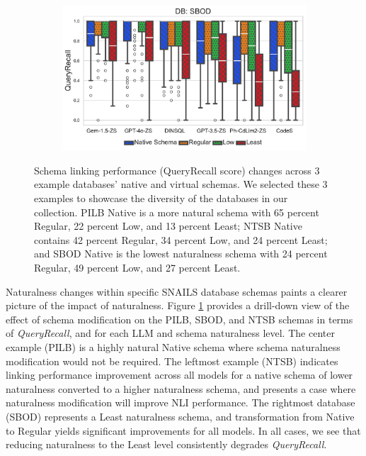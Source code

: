 \begin{figure}
\begin{subfigure}{\figwidthmod\linewidth}
  \end{subfigure}
  \begin{subfigure}{\figwidthmod\linewidth}
    \includegraphics[width=\linewidth]{figures/natlevel-model-recall-boxplot-db-subset-SBOD.pdf}
  \end{subfigure}
  \caption{Schema linking performance (QueryRecall score) changes across 3 example databases' native and virtual schemas. We selected these 3 examples to showcase the diversity of the databases in our collection. PILB Native is a more natural schema with 65 percent Regular, 22 percent Low, and 13 percent Least; NTSB Native contains 42 percent Regular, 34 percent Low, and 24 percent Least; and SBOD Native is the lowest naturalness schema with 24 percent Regular, 49 percent Low, and 27 percent Least.}
  \label{fig:recall-boxplot-dbs}
\end{figure}

Naturalness changes within specific SNAILS database schemas paints a clearer picture of the impact of naturalness.
Figure \ref{fig:recall-boxplot-dbs} provides a drill-down view of the effect of schema modification on the PILB, SBOD, and NTSB schemas in terms of \emph{QueryRecall}, and for each LLM and schema naturalness level.
The center example (PILB) is a highly natural Native schema where schema naturalness modification would not be required. The leftmost example (NTSB) indicates linking performance improvement across all models for a native schema of lower naturalness converted to a higher naturalness schema, and presents a case where naturalness modification will improve NLI performance. The rightmost database (SBOD) represents a Least naturalness schema, and transformation from Native to Regular yields significant improvements for all models. In all cases, we see that reducing naturalness to the Least level consistently degrades \emph{QueryRecall}. 

